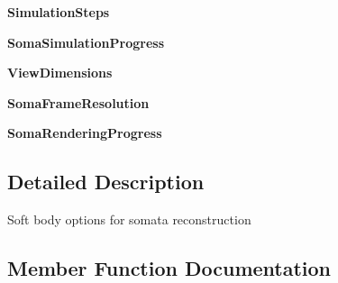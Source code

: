 \begin{DoxyCompactItemize}
\item 
{\bfseries Simulation\+Steps}\hypertarget{classui__soft__body__panel_1_1SoftBodyOptions_a80af8c4fa41cc21bba9af237058dcaf5}{}\label{classui__soft__body__panel_1_1SoftBodyOptions_a80af8c4fa41cc21bba9af237058dcaf5}

\item 
{\bfseries Soma\+Simulation\+Progress}\hypertarget{classui__soft__body__panel_1_1SoftBodyOptions_ab5fa3eb38f632b140775053e18568443}{}\label{classui__soft__body__panel_1_1SoftBodyOptions_ab5fa3eb38f632b140775053e18568443}

\item 
{\bfseries View\+Dimensions}\hypertarget{classui__soft__body__panel_1_1SoftBodyOptions_a1847902a7c0fa6a822940022965cbf1e}{}\label{classui__soft__body__panel_1_1SoftBodyOptions_a1847902a7c0fa6a822940022965cbf1e}

\item 
{\bfseries Soma\+Frame\+Resolution}\hypertarget{classui__soft__body__panel_1_1SoftBodyOptions_a5b99f412d360e0b606b73c86991afd8c}{}\label{classui__soft__body__panel_1_1SoftBodyOptions_a5b99f412d360e0b606b73c86991afd8c}

\item 
{\bfseries Soma\+Rendering\+Progress}\hypertarget{classui__soft__body__panel_1_1SoftBodyOptions_a2ef66475fe1ebd7638e210ca2536bef7}{}\label{classui__soft__body__panel_1_1SoftBodyOptions_a2ef66475fe1ebd7638e210ca2536bef7}

\end{DoxyCompactItemize}


\subsection{Detailed Description}


\begin{DoxyVerb}Soft body options for somata reconstruction\end{DoxyVerb}
 

\subsection{Member Function Documentation}
